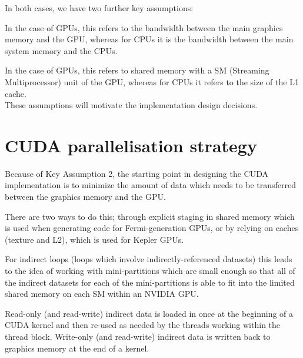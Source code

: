 \documentclass[11pt]{article}
\begin{document}
\noindent In both cases, we have two further key assumptions:

\vspace{0.1in}
\vspace{0.1in}

\noindent In the case of GPUs, this refers to the bandwidth between the main
graphics memory and the GPU, whereas for CPUs it is the bandwidth between
the main system memory and the CPUs.

\vspace{0.1in}
\vspace{0.1in}

\noindent In the case of GPUs, this refers to shared memory with a SM
(Streaming Multiprocessor) unit of the GPU, whereas for CPUs it
refers to the size of the L1 cache.\\


\noindent These assumptions will motivate the implementation design decisions.




\newpage

\section{CUDA parallelisation strategy}

Because of Key Assumption 2, the starting point in designing the
CUDA implementation is to minimize the amount of data which needs
to be transferred between the graphics memory and the GPU.

There are two ways to do this; through explicit staging in shared memory
which is used when generating code for Fermi-generation GPUs, or by
relying on caches (texture and L2), which is used for Kepler GPUs.

For indirect loops (loops which involve indirectly-referenced datasets)
this leads to the idea of working with mini-partitions which are small
enough so that all of the indirect datasets for each of the mini-partitions
is able to fit into the limited shared memory on each SM within an NVIDIA
GPU.

Read-only (and read-write) indirect data is loaded in once at the beginning
of a CUDA kernel and then re-used as needed by the threads working within
the thread block.  Write-only (and read-write) indirect data is written
back to graphics memory at the end of a kernel.
\end{document}
